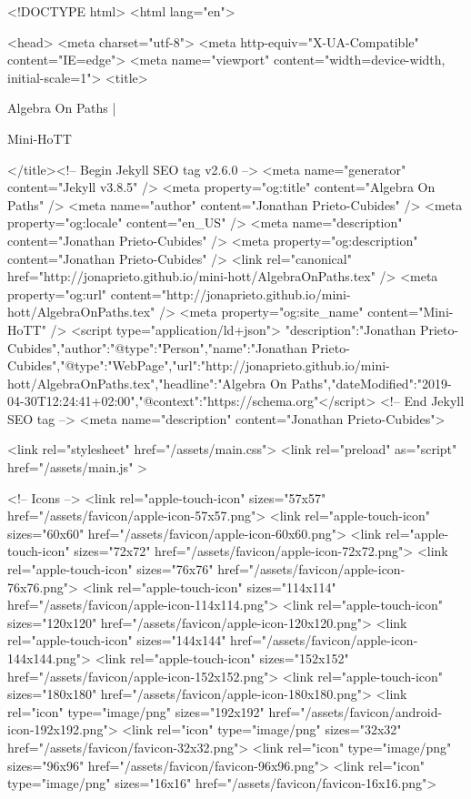 <!DOCTYPE html>
<html lang="en">

<head>
  <meta charset="utf-8">
  <meta http-equiv="X-UA-Compatible" content="IE=edge">
  <meta name="viewport" content="width=device-width, initial-scale=1">
  <title>
    
      
        Algebra On Paths |
      
        Mini-HoTT
    
  </title><!-- Begin Jekyll SEO tag v2.6.0 -->
<meta name="generator" content="Jekyll v3.8.5" />
<meta property="og:title" content="Algebra On Paths" />
<meta name="author" content="Jonathan Prieto-Cubides" />
<meta property="og:locale" content="en_US" />
<meta name="description" content="Jonathan Prieto-Cubides" />
<meta property="og:description" content="Jonathan Prieto-Cubides" />
<link rel="canonical" href="http://jonaprieto.github.io/mini-hott/AlgebraOnPaths.tex" />
<meta property="og:url" content="http://jonaprieto.github.io/mini-hott/AlgebraOnPaths.tex" />
<meta property="og:site_name" content="Mini-HoTT" />
<script type="application/ld+json">
{"description":"Jonathan Prieto-Cubides","author":{"@type":"Person","name":"Jonathan Prieto-Cubides"},"@type":"WebPage","url":"http://jonaprieto.github.io/mini-hott/AlgebraOnPaths.tex","headline":"Algebra On Paths","dateModified":"2019-04-30T12:24:41+02:00","@context":"https://schema.org"}</script>
<!-- End Jekyll SEO tag -->
<meta name="description" content="Jonathan Prieto-Cubides">

  <link rel="stylesheet" href="/assets/main.css">
  <link rel="preload" as="script" href="/assets/main.js" >

  <!-- Icons -->
  <link rel="apple-touch-icon" sizes="57x57" href="/assets/favicon/apple-icon-57x57.png">
  <link rel="apple-touch-icon" sizes="60x60" href="/assets/favicon/apple-icon-60x60.png">
  <link rel="apple-touch-icon" sizes="72x72" href="/assets/favicon/apple-icon-72x72.png">
  <link rel="apple-touch-icon" sizes="76x76" href="/assets/favicon/apple-icon-76x76.png">
  <link rel="apple-touch-icon" sizes="114x114" href="/assets/favicon/apple-icon-114x114.png">
  <link rel="apple-touch-icon" sizes="120x120" href="/assets/favicon/apple-icon-120x120.png">
  <link rel="apple-touch-icon" sizes="144x144" href="/assets/favicon/apple-icon-144x144.png">
  <link rel="apple-touch-icon" sizes="152x152" href="/assets/favicon/apple-icon-152x152.png">
  <link rel="apple-touch-icon" sizes="180x180" href="/assets/favicon/apple-icon-180x180.png">
  <link rel="icon" type="image/png" sizes="192x192"  href="/assets/favicon/android-icon-192x192.png">
  <link rel="icon" type="image/png" sizes="32x32" href="/assets/favicon/favicon-32x32.png">
  <link rel="icon" type="image/png" sizes="96x96" href="/assets/favicon/favicon-96x96.png">
  <link rel="icon" type="image/png" sizes="16x16" href="/assets/favicon/favicon-16x16.png">

